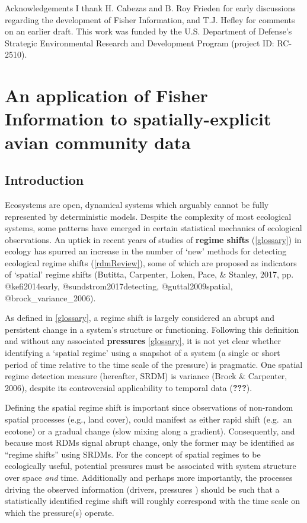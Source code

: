 \documentclass[12pt,twoside,openany]{reedthesis}
\begin{document}
Acknowledgements
I thank H. Cabezas and B. Roy Frieden for early discussions regarding the development of Fisher Information, and T.J. Hefley for comments on an earlier draft. This work was funded by the U.S. Department of Defense's Strategic Environmental Research and Development Program (project ID: RC-2510).

\hypertarget{fisherSpatial}{%
\chapter{An application of Fisher Information to spatially-explicit avian community data}\label{fisherSpatial}}

\hypertarget{introduction-2}{%
\section{Introduction}\label{introduction-2}}

Ecosystems are open, dynamical systems which arguably cannot be fully represented by deterministic models. Despite the complexity of most ecological systems, some patterns have emerged in certain statistical mechanics of ecological observations. An uptick in recent years of studies of \textbf{regime shifts} (\ref{glossary}) in ecology has spurred an increase in the number of `new' methods for detecting ecological regime shifts (\ref{rdmReview}), some of which are proposed as indicators of `spatial' regime shifts (Butitta, Carpenter, Loken, Pace, \& Stanley, 2017, pp. @kefi2014early, @sundstrom2017detecting, @guttal2009spatial, @brock\_variance\_2006).

As defined in \ref{glossary}, a regime shift is largely considered an abrupt and persistent change in a system's structure or functioning. Following this definition and without any associated \textbf{pressures} \ref{glossary}, it is not yet clear whether identifying a `spatial regime' using a snapshot of a system (a single or short period of time relative to the time scale of the pressure) is pragmatic. One spatial regime detection measure (hereafter, SRDM) is variance (Brock \& Carpenter, 2006), despite its controversial applicability to temporal data ({\textbf{???}}).

Defining the spatial regime shift is important since observations of non-random spatial processes (e.g., land cover), could manifest as either rapid shift (e.g.~an ecotone) or a gradual change (slow mixing along a gradient). Consequently, and because most RDMs signal abrupt change, only the former may be identified as ``regime shifts'' using SRDMs. For the concept of spatial regimes to be ecologically useful, potential pressures must be associated with system structure over space \emph{and} time. Additionally and perhaps more importantly, the processes driving the observed information (drivers, pressures ) should be such that a statistically identified regime shift will roughly correspond with the time scale on which the pressure(s) operate.
\end{document}
